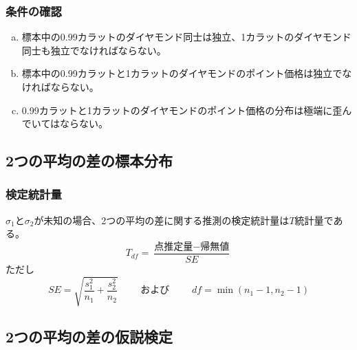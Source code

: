 \begin{frame}
\frametitle{条件の確認}


\begin{enumerate}[(a)]

\item 標本中の0.99カラットのダイヤモンド同士は独立、1カラットのダイヤモンド同士も独立でなければならない。

\item 標本中の0.99カラットと1カラットのダイヤモンドのポイント価格は独立でなければならない。

\item 0.99カラットと1カラットのダイヤモンドのポイント価格の分布は極端に歪んでいてはならない。


\end{enumerate}

\end{frame}


\subsection{2つの平均の差の標本分布}


\begin{frame}
\frametitle{検定統計量}

{$\sigma_1$と$\sigma_2$が未知の場合、2つの平均の差に関する推測の検定統計量は$T$統計量である。
\[ T_{df} = \frac{\text{点推定量} - \text{帰無値}}{SE} \]
ただし
\[ SE = \sqrt{ \frac{s_1^2}{n_1} + \frac{s_2^2}{n_2} } \qquad \text{ および } \qquad df = \min(n_1 - 1, n_2 - 1) \]
}


\end{frame}


\subsection{2つの平均の差の仮説検定}

